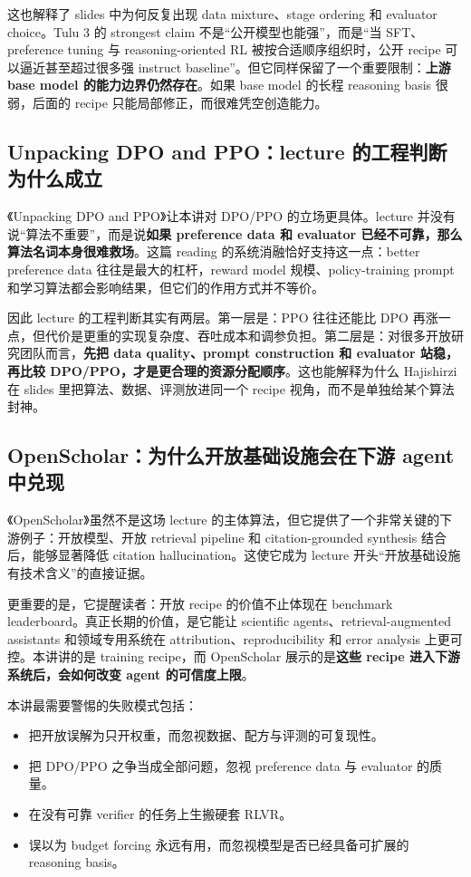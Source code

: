 这也解释了 slides 中为何反复出现 data mixture、stage ordering 和 evaluator choice。Tulu 3 的 strongest claim 不是“公开模型也能强”，而是“当 SFT、preference tuning 与 reasoning-oriented RL 被按合适顺序组织时，公开 recipe 可以逼近甚至超过很多强 instruct baseline”。但它同样保留了一个重要限制：\textbf{上游 base model 的能力边界仍然存在}。如果 base model 的长程 reasoning basis 很弱，后面的 recipe 只能局部修正，而很难凭空创造能力。

\subsection{Unpacking DPO and PPO：lecture 的工程判断为什么成立}

《Unpacking DPO and PPO》让本讲对 DPO/PPO 的立场更具体。lecture 并没有说“算法不重要”，而是说\textbf{如果 preference data 和 evaluator 已经不可靠，那么算法名词本身很难救场}。这篇 reading 的系统消融恰好支持这一点：better preference data 往往是最大的杠杆，reward model 规模、policy-training prompt 和学习算法都会影响结果，但它们的作用方式并不等价。

因此 lecture 的工程判断其实有两层。第一层是：PPO 往往还能比 DPO 再涨一点，但代价是更重的实现复杂度、吞吐成本和调参负担。第二层是：对很多开放研究团队而言，\textbf{先把 data quality、prompt construction 和 evaluator 站稳，再比较 DPO/PPO，才是更合理的资源分配顺序}。这也能解释为什么 Hajishirzi 在 slides 里把算法、数据、评测放进同一个 recipe 视角，而不是单独给某个算法封神。

\subsection{OpenScholar：为什么开放基础设施会在下游 agent 中兑现}

《OpenScholar》虽然不是这场 lecture 的主体算法，但它提供了一个非常关键的下游例子：开放模型、开放 retrieval pipeline 和 citation-grounded synthesis 结合后，能够显著降低 citation hallucination。这使它成为 lecture 开头“开放基础设施有技术含义”的直接证据。

更重要的是，它提醒读者：开放 recipe 的价值不止体现在 benchmark leaderboard。真正长期的价值，是它能让 scientific agents、retrieval-augmented assistants 和领域专用系统在 attribution、reproducibility 和 error analysis 上更可控。本讲讲的是 training recipe，而 OpenScholar 展示的是\textbf{这些 recipe 进入下游系统后，会如何改变 agent 的可信度上限}。

本讲最需要警惕的失败模式包括：
\begin{itemize}
\item 把开放误解为只开权重，而忽视数据、配方与评测的可复现性。
\item 把 DPO/PPO 之争当成全部问题，忽视 preference data 与 evaluator 的质量。
\item 在没有可靠 verifier 的任务上生搬硬套 RLVR。
\item 误以为 budget forcing 永远有用，而忽视模型是否已经具备可扩展的 reasoning basis。
\end{itemize}

